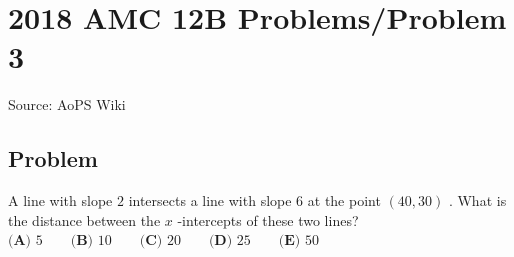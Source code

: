 \documentclass[12pt]{article}
\begin{document}
\section*{{2018 AMC 12B Problems/Problem 3}}
Source: AoPS Wiki

\subsection*{Problem}
A line with slope $2$ intersects a line with slope $6$ at the point $(40,30)$ . What is the distance between the $x$ -intercepts of these two lines? $\textbf{(A) } 5 \qquad \textbf{(B) } 10 \qquad \textbf{(C) } 20 \qquad \textbf{(D) } 25 \qquad \textbf{(E) } 50$
\end{document}
